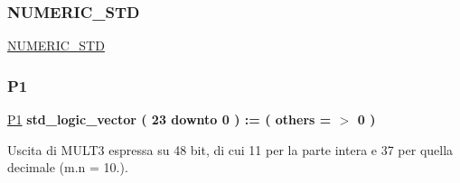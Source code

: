 \mbox{\label{group___linear_regression_gae00f3f04545af57582ff10609eee23e2}} 
\subsubsection{\texorpdfstring{N\+U\+M\+E\+R\+I\+C\+\_\+\+S\+TD}{NUMERIC\_STD}}
{\footnotesize\ttfamily \hyperlink{group___linear_regression_gae00f3f04545af57582ff10609eee23e2}{N\+U\+M\+E\+R\+I\+C\+\_\+\+S\+TD}\hspace{0.3cm}{\ttfamily [Package]}}

\mbox{\label{group___linear_regression_ga6628650c9428eb89bdfa36a2efa1cb37}} 
\subsubsection{\texorpdfstring{P1}{P1}}
{\footnotesize\ttfamily \hyperlink{group___linear_regression_ga6628650c9428eb89bdfa36a2efa1cb37}{P1} {\bfseries \textcolor{vhdlchar}{std\+\_\+logic\+\_\+vector}\textcolor{vhdlchar}{ }\textcolor{vhdlchar}{(}\textcolor{vhdlchar}{ }\textcolor{vhdlchar}{ } \textcolor{vhdldigit}{23} \textcolor{vhdlchar}{ }\textcolor{vhdlchar}{downto}\textcolor{vhdlchar}{ }\textcolor{vhdlchar}{ } \textcolor{vhdldigit}{0} \textcolor{vhdlchar}{ }\textcolor{vhdlchar}{)}\textcolor{vhdlchar}{ }\textcolor{vhdlchar}{ }\textcolor{vhdlchar}{ }\textcolor{vhdlchar}{\+:}\textcolor{vhdlchar}{=}\textcolor{vhdlchar}{ }\textcolor{vhdlchar}{(}\textcolor{vhdlchar}{ }\textcolor{vhdlchar}{ }\textcolor{vhdlchar}{others}\textcolor{vhdlchar}{ }\textcolor{vhdlchar}{ }\textcolor{vhdlchar}{=}\textcolor{vhdlchar}{ }\textcolor{vhdlchar}{$>$}\textcolor{vhdlchar}{ }\textcolor{vhdlchar}{\textquotesingle{}}\textcolor{vhdlchar}{ } \textcolor{vhdldigit}{0} \textcolor{vhdlchar}{ }\textcolor{vhdlchar}{\textquotesingle{}}\textcolor{vhdlchar}{ }\textcolor{vhdlchar}{)}\textcolor{vhdlchar}{ }} \hspace{0.3cm}{\ttfamily [Signal]}}

Uscita di M\+U\+L\+T3 espressa su 48 bit, di cui 11 per la parte intera e 37 per quella decimale (m.\+n = 10.). \mbox{\label{group___linear_regression_gab0bf0189296a8c52f6e36c853c8d3a77}} 
